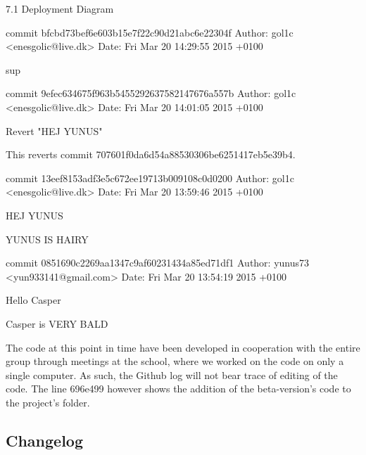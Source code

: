 \documentclass[12pt,a4paper]{article}
\begin{document}
7.1 Deployment Diagram

commit bfcbd73bef6e603b15e7f22c90d21abc6e22304f
Author: gol1c <enesgolic@live.dk>
Date:   Fri Mar 20 14:29:55 2015 +0100

sup

commit 9efec634675f963b5455292637582147676a557b
Author: gol1c <enesgolic@live.dk>
Date:   Fri Mar 20 14:01:05 2015 +0100

Revert "HEJ YUNUS"

This reverts commit 707601f0da6d54a88530306be6251417eb5e39b4.

commit 13eef8153adf3e5c672ee19713b009108c0d0200
Author: gol1c <enesgolic@live.dk>
Date:   Fri Mar 20 13:59:46 2015 +0100

HEJ YUNUS

YUNUS IS HAIRY

commit 0851690c2269aa1347c9af60231434a85ed71df1
Author: yunus73 <yun933141@gmail.com>
Date:   Fri Mar 20 13:54:19 2015 +0100

Hello Casper

Casper is VERY BALD

\noindent\makebox[\linewidth]{\rule{16.5cm}{0.4pt}}

The code at this point in time have been developed in cooperation with the entire group through meetings at the school, where we worked on the code on only a single computer. As such, the Github log will not bear trace of editing of the code. The line 696e499 however shows the addition of the beta-version's code to the project's folder.
\newpage
\subsection{Changelog}
\end{document}
